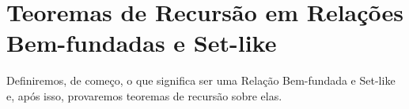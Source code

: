 \chapter[Recursão e Indução]{Teoremas de Recursão em Relações Bem-fundadas e Set-like}
\label{ch:recursao}
Definiremos, de começo, o que significa ser uma Relação Bem-fundada e Set-like e, após isso, provaremos teoremas de recursão sobre elas.


